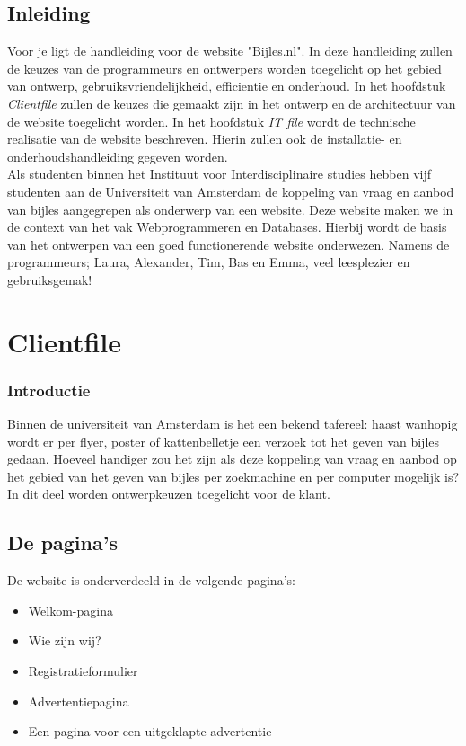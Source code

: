 \documentclass{report}
\begin{document}
    \tableofcontents

    \section*{Inleiding}
        Voor je ligt de handleiding voor de website "Bijles.nl". In deze handleiding zullen de keuzes van de programmeurs en ontwerpers worden toegelicht op het gebied van ontwerp, gebruiksvriendelijkheid, efficientie en onderhoud. In het hoofdstuk \emph{Clientfile} zullen de keuzes die gemaakt zijn in het ontwerp en de architectuur van de website toegelicht worden. In het hoofdstuk \emph{IT file} wordt de technische realisatie van de website beschreven. Hierin zullen ook de installatie- en onderhoudshandleiding gegeven worden.\\
        
        Als studenten binnen het Instituut voor Interdisciplinaire studies hebben vijf studenten aan de Universiteit van Amsterdam de koppeling van vraag en aanbod van bijles aangegrepen als onderwerp van een website. Deze website maken we in de context van het vak Webprogrammeren en Databases. Hierbij wordt de basis van het ontwerpen van een goed functionerende website onderwezen. Namens de programmeurs; Laura, Alexander, Tim, Bas en Emma, veel leesplezier en gebruiksgemak!

    \chapter{Clientfile}
        \subsection*{Introductie}
            Binnen de universiteit van Amsterdam is het een bekend tafereel: haast wanhopig wordt er per flyer, poster of kattenbelletje een verzoek tot het geven van bijles gedaan. Hoeveel handiger zou het zijn als deze koppeling van vraag en aanbod op het gebied van het geven van bijles per zoekmachine en per computer mogelijk is? \\
        
            In dit deel worden ontwerpkeuzen toegelicht voor de klant.\\

        \section{De pagina's}
            De website is onderverdeeld in de volgende pagina's:
            \begin{itemize}
                \item Welkom-pagina
                \item Wie zijn wij?
                \item Registratieformulier
                \item Advertentiepagina
                \item Een pagina voor een uitgeklapte advertentie
            \end{itemize}
            
\end{document}
